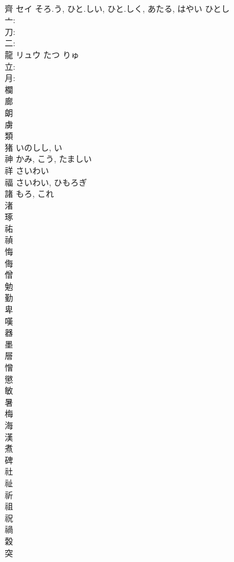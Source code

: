 \documentclass[8pt]{extreport}
\begin{document}
\begin{CJK}{UTF8}{min}
\\	齊	セイ	そろ.う, ひと.しい, ひと.しく, あたる, はやい	ひとし	
\\	亠: 
\\	刀: 
\\	二: 
\\	龍	リュウ	たつ	りゅ	
\\	立: 
\\	月: 
\\	欄						
\\	廊						
\\	朗						
\\	虜						
\\	類						
\\	猪		いのしし, い				
\\	神		かみ, こう, たましい				
\\	祥		さいわい				
\\	福		さいわい, ひもろぎ				
\\	諸		もろ, これ				
\\	渚						
\\	琢						
\\	祐						
\\	禎						
\\	悔						
\\	侮						
\\	僧						
\\	勉						
\\	勤						
\\	卑						
\\	嘆						
\\	器						
\\	墨						
\\	層						
\\	憎						
\\	懲						
\\	敏						
\\	暑						
\\	梅						
\\	海						
\\	漢						
\\	煮						
\\	碑						
\\	社						
\\	祉						
\\	祈						
\\	祖						
\\	祝						
\\	禍						
\\	穀						
\\	突						

\end{CJK}
\end{document}
